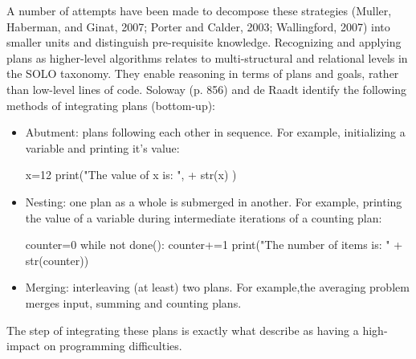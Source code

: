 A number of attempts have been made to decompose these strategies (Muller, Haberman, and Ginat, 2007; Porter and Calder, 2003; Wallingford, 2007) into smaller units and distinguish pre-requisite knowledge. Recognizing and applying plans as higher-level algorithms relates to multi-structural and relational levels in the SOLO taxonomy. They enable reasoning in terms of plans and goals, rather than low-level lines of code. Soloway (p. 856) and de Raadt identify the following methods of integrating plans (bottom-up):
\begin{itemize}
\item Abutment: plans following each other in sequence. For example, initializing a variable and printing it's value:
\begin{PYTHON}
x=12
print("The value of x is: ", + str(x) )
\end{PYTHON}


\item Nesting: one plan as a whole is submerged in another. For example, printing the value of a variable during intermediate iterations of a counting plan:
\begin{PYTHON}
counter=0
while not done():
    counter+=1
    print("The number of items is: " + str(counter))
\end{PYTHON}

\item Merging: interleaving (at least) two plans. For example,the averaging problem merges input, summing and counting plans.
\end{itemize}

The step of integrating these plans is exactly what  describe as having a high-impact on programming difficulties.

